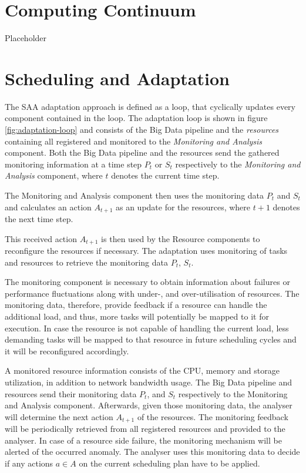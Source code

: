 



    \section{Computing Continuum}
    \label{sec:computing-continuum-background}

        Placeholder


    \section{Scheduling and Adaptation}
    \label{sec:scheduling-and-adaptation-background}

        The SAA adaptation approach is defined as a loop, that cyclically updates every component contained in the loop.
        The adaptation loop is shown in figure \ref{fig:adaptation-loop} and consists of the Big Data pipeline and the \emph{resources} containing all registered and monitored to the \emph{Monitoring and Analysis} component. 
        Both the Big Data pipeline and the resources send the gathered monitoring information at a time step $P_t$ or $S_t$ respectively to the \emph{Monitoring and Analysis} component, where $t$ denotes the current time step.

        The Monitoring and Analysis component then uses the monitoring data $P_t$ and $S_t$ and calculates an action $A_{t+1}$ as an update for the resources, where $t+1$ denotes the next time step.
  
        This received action $A_{t+1}$ is then used by the Resource components to reconfigure the resources if necessary.
        The adaptation uses monitoring of tasks and resources to retrieve the monitoring data $P_t$, $S_t$.
        
        The monitoring component is necessary to obtain information about failures or performance fluctuations along with under-, and over-utilisation of resources.
        The monitoring data, therefore, provide feedback if a resource can handle the additional load, and thus, more tasks will potentially be mapped to it for execution. 
        In case the resource is not capable of handling the current load, less demanding tasks will be mapped to that resource in future scheduling cycles and it will be reconfigured accordingly.

        A monitored resource information consists of the CPU, memory and storage utilization, in addition to network bandwidth usage.
        The Big Data pipeline and resources send their monitoring data $P_t$, and $S_t$ respectively to the Monitoring and Analysis component.
        Afterwards, given those monitoring data, the analyser will determine the next action $A_{t+1}$ of the resources.
        The monitoring feedback will be periodically retrieved from all registered resources and provided to the analyser.
        In case of a resource side failure, the monitoring mechanism will be alerted of the occurred anomaly.  
        The analyser uses this monitoring data to decide if any actions $a \in A$ on the current scheduling plan have to be applied.
  
